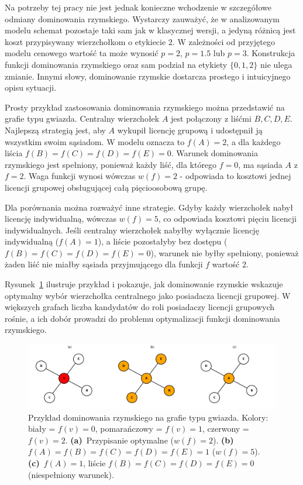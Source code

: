 Na potrzeby tej pracy nie jest jednak konieczne wchodzenie w szczegółowe odmiany dominowania rzymskiego. Wystarczy zauważyć, że w analizowanym modelu schemat pozostaje taki sam jak w klasycznej wersji, a jedyną różnicą jest koszt przypisywany wierzchołkom o etykiecie $2$. W zależności od przyjętego modelu cenowego wartość ta może wynosić $p=2$, $p=1.5$ lub $p=3$. Konstrukcja funkcji dominowania rzymskiego oraz sam podział na etykiety $\{0,1,2\}$ nie ulega zmianie. Innymi słowy, dominowanie rzymskie dostarcza prostego i intuicyjnego opisu sytuacji.

Prosty przykład zastosowania dominowania rzymskiego można przedstawić na grafie typu gwiazda. Centralny wierzchołek $A$ jest połączony z liśćmi $B, C, D, E$. Najlepszą strategią jest, aby $A$ wykupił licencję grupową i udostępnił ją wszystkim swoim sąsiadom. W modelu oznacza to $f(A)=2$, a dla każdego liścia $f(B)=f(C)=f(D)=f(E)=0$. Warunek dominowania rzymskiego jest spełniony, ponieważ każdy liść, dla którego $f=0$, ma sąsiada $A$ z $f=2$. Waga funkcji wynosi wówczas $w(f)=2$ - odpowiada to kosztowi jednej licencji grupowej obsługującej całą pięcioosobową grupę.

Dla porównania można rozważyć inne strategie. Gdyby każdy wierzchołek nabył licencję indywidualną, wówczas $w(f)=5$, co odpowiada kosztowi pięciu licencji indywidualnych. Jeśli centralny wierzchołek nabyłby wyłącznie licencję indywidualną ($f(A)=1$), a liście pozostałyby bez dostępu ($f(B)=f(C)=f(D)=f(E)=0$), warunek nie byłby spełniony, ponieważ żaden liść nie miałby sąsiada przyjmującego dla funkcji $f$ wartość 2.

Rysunek~\ref{fig:romandomatinonstarexamepl} ilustruje przykład i pokazuje, jak dominowanie rzymskie wskazuje optymalny wybór wierzchołka centralnego jako posiadacza licencji grupowej. W większych grafach liczba kandydatów do roli posiadaczy licencji grupowych rośnie, a ich dobór prowadzi do problemu optymalizacji funkcji dominowania rzymskiego.


\begin{figure}[H]
  \centering
  \includegraphics[width=1\textwidth]{assets/stars.png}
  \caption{
  Przykład dominowania rzymskiego na grafie typu gwiazda.  
  Kolory: biały = $f(v)=0$, pomarańczowy = $f(v)=1$, czerwony = $f(v)=2$.
    \textbf{(a)}~Przypisanie optymalne ($w(f)=2$).
    \textbf{(b)}~$f(A)=f(B)=f(C)=f(D)=f(E)=1$ ($w(f)=5$).
    \textbf{(c)}~$f(A)=1$, liście $f(B)=f(C)=f(D)=f(E)=0$ (niespełniony warunek).
  }
  \label{fig:romandomatinonstarexamepl}
\end{figure}


